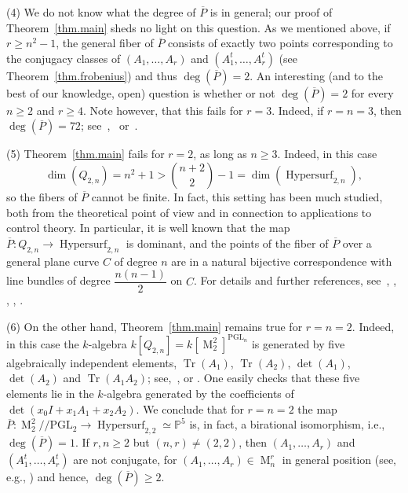 \documentclass[12pt]{amsart}
\numberwithin{equation}{section}
\numberwithin{subsection}{section}
\theoremstyle{definition} \newtheorem{definition}[theorem]{Definition}
\newcommand\Hypersurf{\operatorname{Hypersurf}}
\newcommand{\PGL}{\mathrm{PGL}}
\newcommand{\tr}{\operatorname{Tr}}
\newcommand{\Mat}{\operatorname{M}}
\newcommand{\bbP}{\mathbb{P}}
\begin{document}
\smallskip
(4) We do not know what the degree of $\overline{P}$ is in general; our proof 
of Theorem~\ref{thm.main} sheds no light on this question. As we mentioned
above, if $r \geqslant n^2 -1$, the general fiber of $\overline{P}$ 
consists of exactly two points corresponding to
the conjugacy classes of $(A_1, \dots, A_r)$ and $(A_1^t, \dots, A_r^t)$ 
(see Theorem~\ref{thm.frobenius}) and thus $\deg(\overline{P}) = 2$.
An interesting (and to the best of our knowledge, open)
question is whether or not
$\deg(\overline{P}) = 2$ for every $n \geqslant 2$ and $r \geqslant 4$.
Note however, that this fails for $r = 3$. Indeed,
if $r = n = 3$, then $\deg(\overline{P}) = 72$;
see~\cite{grassmann},~\cite[Corollary 6.4]{beauville} 
or~\cite[Theorem 9.3.6]{dolgachev}. 

\smallskip
(5) Theorem~\ref{thm.main} fails for $r = 2$, as long as
$n \geqslant 3$. Indeed, in this case
\[ \dim(Q_{2, n}) = n^2 + 1 >
\binom{n + 2}{2} - 1 = \dim(\Hypersurf_{2, n}) , \]
so the fibers of $\overline{P}$ cannot be finite.
In fact, this setting has been much studied, 
both from the theoretical point of view and in connection to
applications to control theory.  In particular, it is well 
known that the map 
$\overline{P} \colon Q_{2, n} \to \Hypersurf_{2, n}$ 
is dominant, and the points 
of the fiber of $\overline{P}$ over 
a general plane curve $C$ of degree $n$ are in a natural
bijective  correspondence with line bundles of degree
$\dfrac{n(n-1)}{2}$ on $C$.  For details
and further references, see~\cite{ct}, \cite{vinnikov}, 
\cite[Section 3]{beauville}, \cite[Section 4.1]{dolgachev}, \cite{neretin}.

\smallskip
(6) On the other hand, Theorem~\ref{thm.main} remains true for $r = n = 2$. 
Indeed, in this case the $k$-algebra $k[Q_{2, n}] = k[\Mat_2^2]^{\PGL_n}$
is generated by five algebraically independent elements, 
$\tr(A_1)$, $\tr(A_2)$, 
$\det(A_1)$, $\det(A_2)$ and $\tr(A_1 A_2)$; 
see,~\cite[Theorem 2.1]{procesi},
\cite[p. 20]{herstein} or \cite[Lemma 1(1)]{fhl}. 
One easily checks that these five elements lie in the 
$k$-algebra generated by the coefficients
of $\det(x_0 I + x_1 A_1 + x_2 A_2)$. We conclude that for $r = n = 2$
the map $\overline{P} \colon \Mat_2^2/\! \!/\PGL_2 \to \Hypersurf_{2, 2} 
\simeq \bbP^5$ is, in fact, a birational isomorphism, i.e.,
$\deg(\overline{P}) = 1$. If $r, n \geqslant 2$ but $(n, r) \neq (2, 2)$, 
then $(A_1, \dots, A_r)$ and $(A_1^t, \dots, A_r^t)$ are not conjugate, for
$(A_1, \dots, A_r) \in \Mat_n^r$ in general position (see, e.g., 
\cite[Remark 1 on p.~73]{reichstein}) and hence,
$\deg(\overline{P}) \geqslant 2$.
\end{document}
